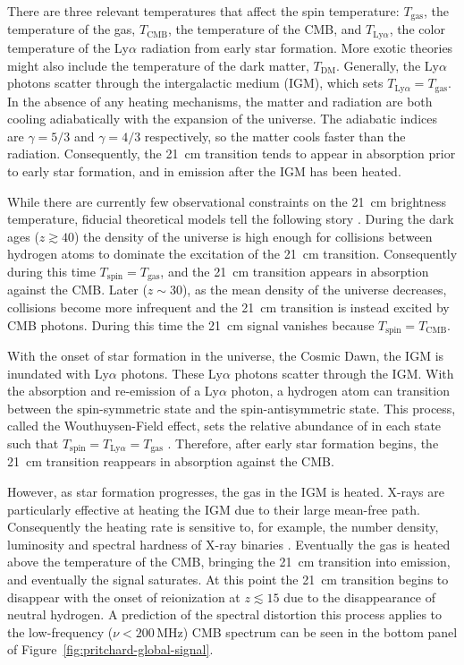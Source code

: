 \begin{bibunit}
There are three relevant temperatures that affect the spin temperature: $T_\text{gas}$, the
temperature of the gas, $T_\text{CMB}$, the temperature of the CMB, and $T_{\text{Ly}\alpha}$, the
color temperature of the Ly$\alpha$ radiation from early star formation. More exotic theories might
also include the temperature of the dark matter, $T_\text{DM}$. Generally,  the Ly$\alpha$ photons
scatter through the intergalactic medium (IGM), which sets $T_{\text{Ly}\alpha} = T_\text{gas}$. In
the absence of any heating mechanisms, the matter and radiation are both cooling adiabatically with
the expansion of the universe.  The adiabatic indices are $\gamma = 5/3$ and $\gamma = 4/3$
respectively, so the matter cools faster than the radiation. Consequently, the 21~cm transition
tends to appear in absorption prior to early star formation, and in emission after the IGM has been
heated.

While there are currently few observational constraints on the 21~cm brightness temperature,
fiducial theoretical models tell the following story \citep{2006PhR...433..181F,
2012RPPh...75h6901P}.  During the dark ages ($z \gtrsim 40$) the density of the universe is high
enough for collisions between hydrogen atoms to dominate the excitation of the 21~cm transition.
Consequently during this time $T_\text{spin} = T_\text{gas}$, and the 21~cm transition appears in
absorption against the CMB.  Later ($z \sim 30$), as the mean density of the universe decreases,
collisions become more infrequent and the 21~cm transition is instead excited by CMB photons. During
this time the 21~cm signal vanishes because $T_\text{spin} = T_\text{CMB}$.

With the onset of star formation in the universe, the Cosmic Dawn, the IGM is inundated with
Ly$\alpha$ photons.  These Ly$\alpha$ photons scatter through the IGM. With the absorption and
re-emission of a Ly$\alpha$ photon, a hydrogen atom can transition between the spin-symmetric state
and the spin-antisymmetric state. This process, called the Wouthuysen-Field effect, sets the
relative abundance of  in each state such that $T_\text{spin} = T_{\text{Ly}\alpha} =
T_\text{gas}$ \citep{1952AJ.....57R..31W,1958PIRE...46..240F}. Therefore, after early star formation
begins, the 21~cm transition reappears in absorption against the CMB.

However, as star formation progresses, the gas in the IGM is heated. X-rays are particularly
effective at heating the IGM due to their large mean-free path. Consequently the heating rate is
sensitive to, for example, the number density, luminosity and spectral hardness of X-ray binaries
\citep{2014MNRAS.437L..36F,2017MNRAS.472.2651G}.  Eventually the gas is heated above the temperature
of the CMB, bringing the 21~cm transition into emission, and eventually the signal saturates. At
this point the 21~cm transition begins to disappear with the onset of reionization at $z \lesssim
15$ due to the disappearance of neutral hydrogen. A prediction of the spectral distortion this
process applies to the low-frequency ($\nu < 200\,\text{MHz}$) CMB spectrum can be seen in the
bottom panel of Figure~\ref{fig:pritchard-global-signal}.


\end{bibunit}
